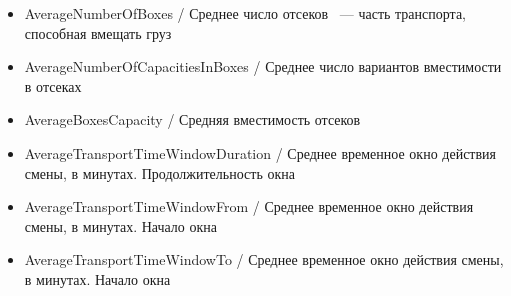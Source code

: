 \documentclass[specification,annotation]{itmo-student-thesis}
\begin{document}
\begin{itemize}
    \item AverageNumberOfBoxes / Среднее число отсеков ~--- часть транспорта, способная вмещать груз
    \item AverageNumberOfCapacitiesInBoxes / Среднее число вариантов вместимости в отсеках
    \item AverageBoxesCapacity / Средняя вместимость отсеков
    \item AverageTransportTimeWindowDuration / Среднее временное окно действия смены, в минутах. Продолжительность окна
    \item AverageTransportTimeWindowFrom / Среднее временное окно действия смены, в минутах. Начало окна
    \item AverageTransportTimeWindowTo / Среднее временное окно действия смены, в минутах. Начало окна	
\end{itemize}
\end{document}
